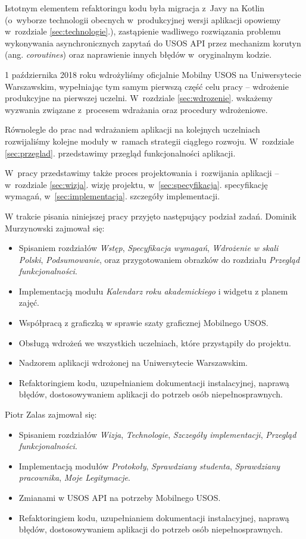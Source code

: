 \documentclass{pracamgr}
\begin{document}
Istotnym elementem refaktoringu kodu była migracja z~Javy na Kotlin (o~wyborze technologii obecnych w~produkcyjnej wersji
aplikacji opowiemy w~rozdziale \ref{sec:technologie}.), zastąpienie wadliwego rozwiązania problemu
wykonywania asynchronicznych zapytań do USOS API przez mechanizm korutyn 
(ang. \textit{coroutines}) oraz naprawienie innych błędów w~oryginalnym kodzie.

1 października 2018 roku wdrożyliśmy oficjalnie Mobilny USOS na Uniwersytecie Warszawskim,
wypełniając tym samym pierwszą część celu pracy -- wdrożenie produkcyjne na pierwszej uczelni.
W~rozdziale \ref{sec:wdrozenie}. wskażemy wyzwania związane z~procesem wdrażania oraz procedury wdrożeniowe.

Równolegle do prac nad wdrażaniem aplikacji na kolejnych uczelniach rozwijaliśmy kolejne
moduły w~ramach strategii ciągłego rozwoju. W~rozdziale \ref{sec:przeglad}. przedstawimy przegląd
funkcjonalności aplikacji.

W~pracy przedstawimy także proces projektowania i~rozwijania aplikacji -- w~rozdziale \ref{sec:wizja}.
wizję projektu, w~\ref{sec:specyfikacja}. specyfikację wymagań, w~\ref{sec:implementacja}. szczegóły implementacji.

W trakcie pisania niniejszej pracy przyjęto następujący podział zadań. Dominik Murzynowski
zajmował się:
\begin{itemize}
	\item Spisaniem rozdziałów \textit{Wstęp}, \textit{Specyfikacja wymagań},
	\textit{Wdrożenie w skali Polski}, \textit{Podsumowanie}, oraz przygotowaniem
	obrazków do rozdziału \textit{Przegląd funkcjonalności}.
	\item Implementacją modułu \textit{Kalendarz roku akademickiego} i widgetu
	z planem zajęć.
	\item Współpracą z graficzką w sprawie szaty graficznej Mobilnego USOS.
	\item Obsługą wdrożeń we wszystkich uczelniach, które przystąpiły do projektu.
	\item Nadzorem aplikacji wdrożonej na Uniwersytecie Warszawskim.
	\item Refaktoringiem kodu, uzupełnianiem dokumentacji instalacyjnej, naprawą
	błędów, dostosowywaniem aplikacji do potrzeb osób niepełnosprawnych.
\end{itemize}
Piotr Zalas zajmował się:
\begin{itemize}
	\item Spisaniem rozdziałów \textit{Wizja}, \textit{Technologie},
	\textit{Szczegóły implementacji}, \textit{Przegląd funkcjonalności}.
	\item Implementacją modułów \textit{Protokoły}, \textit{Sprawdziany studenta},
	\textit{Sprawdziany pracownika}, \textit{Moje Legitymacje}.
	\item Zmianami w USOS API na potrzeby Mobilnego USOS.
	\item Refaktoringiem kodu, uzupełnianiem dokumentacji instalacyjnej, naprawą
	błędów, dostosowywaniem aplikacji do potrzeb osób niepełnosprawnych.
\end{itemize}
\end{document}
